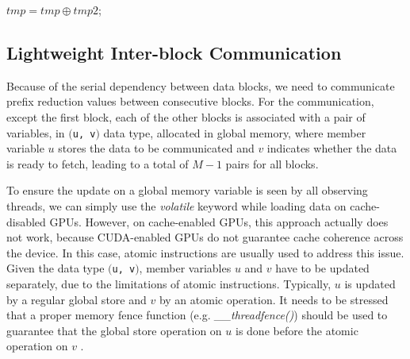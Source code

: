 \documentclass[article]{elsarticle}
\begin{document}
{\begin{algorithm}[!h]
\begin{algorithmic}[1]
        		$tmp = tmp \oplus tmp2$;
	        \EndIf
    	\EndFor
    \EndIf
    
\EndProcedure
\end{algorithmic}
\end{algorithm}
\subsection{Lightweight Inter-block Communication}
Because of the serial dependency between data blocks, we need to communicate prefix reduction values between consecutive blocks. For the communication, except the first block, each of the other blocks is associated with a pair of variables, in \hbox{{\tt $($u, v$)$}} data type, allocated in global memory, where member variable $u$ stores the data to be communicated and $v$ indicates whether the data is ready to fetch, leading to a total of $M-1$ pairs for all blocks.

To ensure the update on a global memory variable is seen by all observing threads, we can simply use the \textit{volatile} keyword while loading data on cache-disabled GPUs. However, on cache-enabled GPUs, this approach actually does not work, because CUDA-enabled GPUs do not guarantee cache coherence across the device. In this case, atomic instructions are usually used to address this issue. Given the data type \hbox{{\tt $($u, v$)$}}, member variables $u$ and $v$ have to be updated separately, due to the limitations of atomic instructions. Typically, $u$ is updated by a regular global store and $v$ by an atomic operation. It needs to be stressed that a proper memory fence function (e.g. \textit{\_\_threadfence()}) should be used to guarantee that the global store operation on $u$ is done before the atomic operation on $v$ \cite{cudacprogramming}.

}
\end{document}
